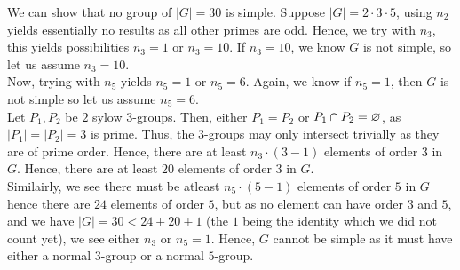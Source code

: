 \begin{example}
	We can show that no group of \(\left| G \right| = 30\) is simple. Suppose \(\left| G \right|  = 2 \cdot 3 \cdot 5\), using \(n_2\) yields essentially no results as all other primes are odd. Hence, we try with \(n_3\), this yields possibilities \(n_3 = 1\) or \(n_3 = 10\). If \(n_3 = 10\), we know \(G\) is not simple, so let us assume \(n_3 = 10\).\\
	Now, trying with \(n_5\) yields \(n_5 = 1\) or \(n_5 = 6\). Again, we know if \(n_5=1\), then \(G\) is not simple so let us assume \(n_5 = 6\). \\
	Let \(P_1, P_2\) be \(2\) sylow \(3\)-groups. Then, either \(P_1 = P_2\) or \(P_1 \cap P_2 = \varnothing\), as \(\left| P_1 \right|  = \left| P_2 \right|  = 3\) is prime. Thus, the \(3\)-groups may only intersect trivially as they are of prime order. Hence, there are at least \(n_3 \cdot \left( 3 - 1 \right) \) elements of order \(3\) in \(G\). Hence, there are at least \(20\) elements of order \(3\) in \(G\).\\
	Similairly, we see there must be atleast \(n_5 \cdot \left( 5 - 1 \right) \) elements of order \(5\) in \(G\) hence there are \(24\) elements of order \(5\), but as no element can have order \(3\) and \(5\), and we have \(\left| G \right|  = 30 < 24 + 20 + 1\) (the \(1\) being the identity which we did not count yet), we see either \(n_3\) or \(n_5 = 1\). Hence, \(G\) cannot be simple as it must have either a normal \(3\)-group or a normal \(5\)-group.
\end{example}
